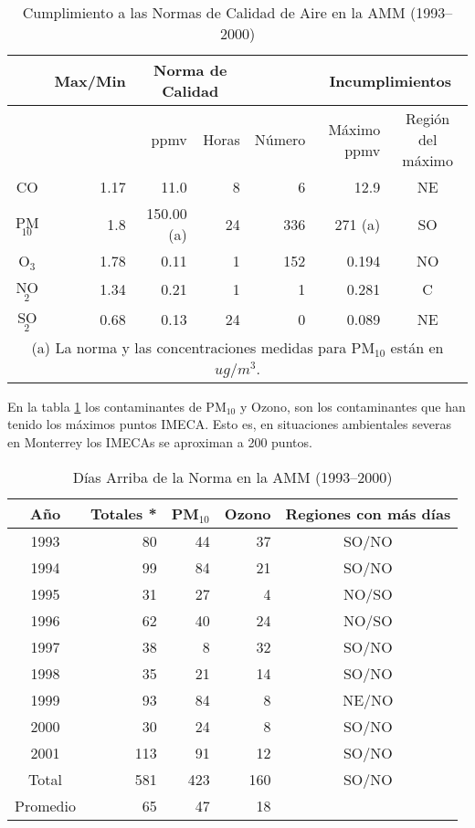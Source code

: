 \begin{table}[H]
    \centering
    \caption{Cumplimiento a las Normas de Calidad de Aire en la AMM (1993--2000)}
	\begin{adjustbox}{max width=0.9\textwidth}
    \begin{tabular}{|c|r|r|r|r|r|c|}
\hline
         & Max/Min &\multicolumn{2}{|c|}{Norma de Calidad}  &  &\multicolumn{2}{c|}{Incumplimientos} \\ \hline
         & &ppmv &Horas &Número &Máximo ppmv &Región del máximo \\ \hline
        CO &1.17 &11.0 &8 &6 &12.9 &NE \\
        PM$_{10}$  &1.8 &150.00 (a) &24 &336 &271 (a) &SO \\
        O$_{3}$  &1.78 &0.11 &1 &152 &0.194 &NO\\
        NO$_{2}$  &1.34 &0.21 &1 &1 &0.281 &C  \\
        SO$_{2}$  &0.68 &0.13 &24 &0 &0.089 &NE\\\hline
	\multicolumn{7}{|c|}{(a) La norma y las concentraciones medidas para PM$_{10}$ están en $ug/m^{3}$.}  \\\hline
        \end{tabular}
\end{adjustbox}
    \label{cumplimiento}
\end{table}

En la tabla \ref{cumplimiento}  los contaminantes de PM$_{10}$ y Ozono, son los contaminantes que han tenido los máximos puntos IMECA. Esto es, en situaciones ambientales severas en Monterrey los IMECAs se aproximan a 200 puntos.

\begin{table}[H]
    \centering
    \caption{Días Arriba de la Norma en la AMM (1993--2000)}
	\begin{adjustbox}{max width=0.8\textwidth}
    \begin{tabular}{|c|r|r|r|c|}
        \hline
	Año &Totales * &PM$_{10}$ &Ozono &Regiones con más días \\ \hline
	1993 &80  &44  &37  &SO/NO  \\ 
	1994 &99  &84  &21  &SO/NO  \\ 
	1995 &31  &27  &4  &NO/SO  \\ 
	1996 &62  &40  &24  &NO/SO \\ 
	1997 &38  &8  &32  &SO/NO \\ 
	1998 &35  &21  &14  &SO/NO \\ 
	1999 &93  &84  &8  &NE/NO \\ 
	2000 &30  &24  &8  &SO/NO \\ 
	2001 &113  &91  &12  &SO/NO \\ \hline 
	Total &581  &423  &160  &SO/NO \\ \hline 
	Promedio &65  &47  &18  &   \\ \hline
        \end{tabular}
\end{adjustbox}
    \label{dias_arriba}
\end{table}

